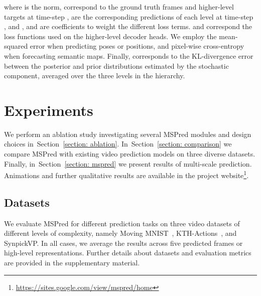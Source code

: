 \documentclass{bmvc2k}
\newcommand{\Section}[1]{Section~\ref{#1}}
\begin{document}
\vspace{-0.5cm}



\vspace{-0.2cm}

where  is the  norm,  correspond to the ground truth frames and higher-level targets at time-step ,  are the corresponding predictions of each level at time-step , and ,  and  are coefficients to weight the different loss terms.
 and  correspond the loss functions used on the higher-level decoder heads. We employ the mean-squared error when predicting poses or positions, and pixel-wise cross-entropy when forecasting semantic maps.
Finally,  corresponds to the KL-divergence error between
the posterior  and prior  distributions estimated by the stochastic component, averaged over the three levels in the hierarchy.


\vspace{-0.2cm}
\section{Experiments}
\vspace{-0.2cm}

We perform an ablation study investigating several MSPred modules and design choices in~\Section{section: ablation}.
In~\Section{section: comparison} we compare MSPred with existing video prediction models on three diverse datasets.
Finally, in~\Section{section: mspred} we present results of multi-scale prediction.
Animations and further qualitative results are available in the project website\footnote{\url{https://sites.google.com/view/mspred/home}}.



\vspace{-0.3cm}
\subsection{Datasets}
\label{section: evaluation}

We evaluate MSPred for different prediction tasks on three video datasets of different levels of complexity, namely Moving MNIST~\cite{Srivastava_UnsupervisedLeaerningOfVideoRepresentationsUsingLSTMs_2015}, KTH-Actions~\cite{Schuldt_KTHRecognizingHumanActionsALocalSVMApproach_2004}, and SynpickVP.
In all cases, we average the results across five predicted frames or high-level representations.
Further details about datasets and evaluation metrics are provided in the supplementary material.
\end{document}
